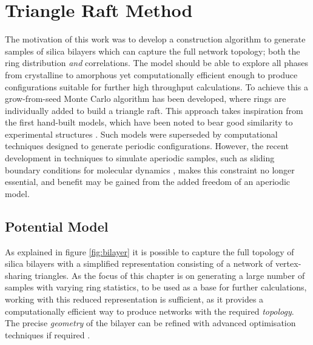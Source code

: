 \section{Triangle Raft Method}
\label{s:triangleraft}

The motivation of this work was to develop a construction algorithm to generate samples of silica bilayers which can capture the full \td{} network topology; both the ring distribution \textit{and} correlations. 
The model should be able to explore all phases from crystalline to amorphous yet computationally efficient enough to produce configurations suitable for further high throughput calculations. 
To achieve this a grow-from-seed Monte Carlo algorithm has been developed, where rings are individually added to build a triangle raft.
This approach takes inspiration from the first hand\--built models, which have been noted to bear good similarity to experimental structures \cite{Shackelford1982a,Buchner2016a}.
Such models were superseded by computational techniques designed to generate periodic configurations. 
However, the recent development in techniques to simulate aperiodic samples, such as sliding boundary conditions for molecular dynamics \cite{Theran2015}, makes this constraint no longer essential, and benefit may be gained from the added freedom of an aperiodic model.


\subsection{Potential Model}

As explained in figure \ref{fig:bilayer} it is possible to capture the full topology of silica bilayers with a simplified representation consisting of a network of vertex\--sharing \sioiii{} triangles. 
As the focus of this chapter is on generating a large number of samples with varying ring statistics, to be used as a base for further calculations,  working with this reduced representation is sufficient, as it provides a computationally efficient way to produce networks with the required \textit{topology}. 
The precise \textit{geometry} of the bilayer can be refined with advanced optimisation techniques if required \cite{Tangney2002}. 

